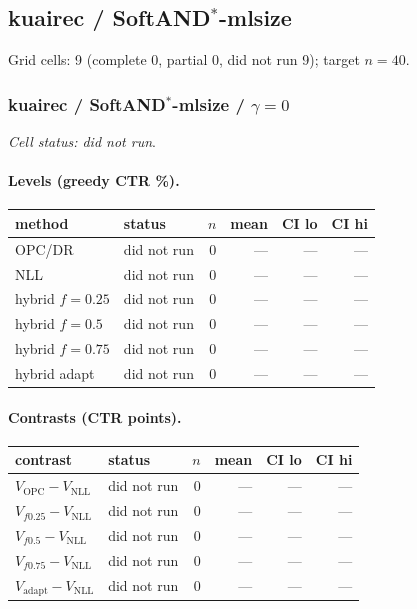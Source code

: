 \documentclass[10pt,a4paper]{article}
\begin{document}
\subsection{kuairec / SoftAND$^*$-mlsize}
Grid cells: 9 (complete 0, partial 0, did not run 9); target $n=40$.
\subsubsection{kuairec / SoftAND$^*$-mlsize / $\gamma=0$}
\emph{Cell status: did not run}.
\paragraph{Levels (greedy CTR \%).}
{\centering\small\begin{tabular}{llrrrr}
\toprule method & status & $n$ & mean & CI lo & CI hi \\
\midrule
OPC/DR & did not run & 0 & --- & --- & --- \\
NLL & did not run & 0 & --- & --- & --- \\
hybrid $f{=}0.25$ & did not run & 0 & --- & --- & --- \\
hybrid $f{=}0.5$ & did not run & 0 & --- & --- & --- \\
hybrid $f{=}0.75$ & did not run & 0 & --- & --- & --- \\
hybrid adapt & did not run & 0 & --- & --- & --- \\
\bottomrule\end{tabular}\par}
\paragraph{Contrasts (CTR points).}
{\centering\small\begin{tabular}{llrrrr}
\toprule contrast & status & $n$ & mean & CI lo & CI hi \\
\midrule
$V_{\mathrm{OPC}}-V_{\mathrm{NLL}}$ & did not run & 0 & --- & --- & --- \\
$V_{f0.25}-V_{\mathrm{NLL}}$ & did not run & 0 & --- & --- & --- \\
$V_{f0.5}-V_{\mathrm{NLL}}$ & did not run & 0 & --- & --- & --- \\
$V_{f0.75}-V_{\mathrm{NLL}}$ & did not run & 0 & --- & --- & --- \\
$V_{\mathrm{adapt}}-V_{\mathrm{NLL}}$ & did not run & 0 & --- & --- & --- \\
\bottomrule\end{tabular}\par}
\bigskip
\end{document}

